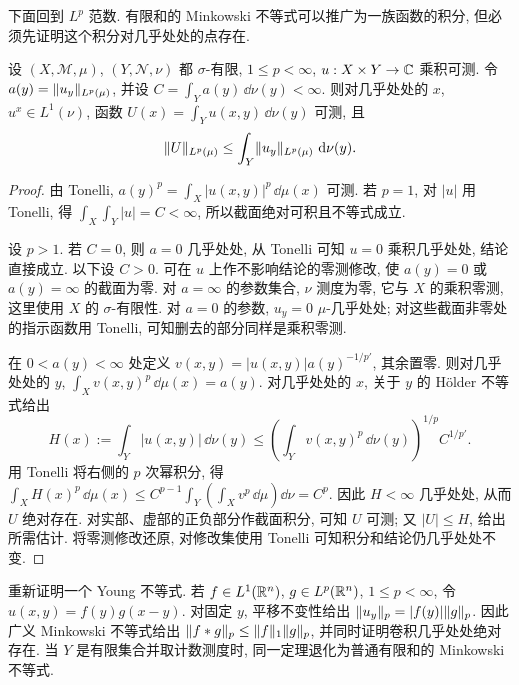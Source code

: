 
下面回到 $L^p$ 范数. 有限和的 Minkowski 不等式可以推广为一族函数的积分, 但必须先证明这个积分对几乎处处的点存在.

\begin{theorem}\label{ra:c8:gmink}
设 $(X,\mathcal M,\mu)$, $(Y,\mathcal N,\nu)$ 都 $\sigma$-有限, $1\le p<\infty$, $u:X\times Y\to\mathbb C$ 乘积可测. 令 $a(y)=\lVert u_y\rVert_{L^p(\mu)}$, 并设 $C=\int_Ya(y)\,\dd\nu(y)<\infty$. 则对几乎处处的 $x$, $u^x\in L^1(\nu)$, 函数 $U(x)=\int_Yu(x,y)\,\dd\nu(y)$ 可测, 且
\[
 \lVert U\rVert_{L^p(\mu)}
 \le\int_Y\lVert u_y\rVert_{L^p(\mu)}\,\,\mathrm d\nu(y).
\]
\end{theorem}
\begin{proof}
由 Tonelli, $a(y)^p=\int_X|u(x,y)|^p\,\dd\mu(x)$ 可测. 若 $p=1$, 对 $|u|$ 用 Tonelli, 得 $\int_X\int_Y|u|=C<\infty$, 所以截面绝对可积且不等式成立.

设 $p>1$. 若 $C=0$, 则 $a=0$ 几乎处处, 从 Tonelli 可知 $u=0$ 乘积几乎处处, 结论直接成立. 以下设 $C>0$. 可在 $u$ 上作不影响结论的零测修改, 使 $a(y)=0$ 或 $a(y)=\infty$ 的截面为零. 对 $a=\infty$ 的参数集合, $\nu$ 测度为零, 它与 $X$ 的乘积零测, 这里使用 $X$ 的 $\sigma$-有限性. 对 $a=0$ 的参数, $u_y=0$ $\mu$-几乎处处; 对这些截面非零处的指示函数用 Tonelli, 可知删去的部分同样是乘积零测.

在 $0<a(y)<\infty$ 处定义 $v(x,y)=|u(x,y)|a(y)^{-1/p'}$, 其余置零. 则对几乎处处的 $y$,
$\int_Xv(x,y)^p\,\dd\mu(x)=a(y)$.
对几乎处处的 $x$, 关于 $y$ 的 Hölder 不等式给出
\[
 H(x):=\int_Y|u(x,y)|\,\dd\nu(y)
 \le\left(\int_Yv(x,y)^p\,\dd\nu(y)\right)^{1/p}C^{1/p'}.
\]
用 Tonelli 将右侧的 $p$ 次幂积分, 得
$\int_XH(x)^p\,\dd\mu(x)\le C^{p-1}\int_Y(\int_Xv^p\,\dd\mu)\dd\nu=C^p$.
因此 $H<\infty$ 几乎处处, 从而 $U$ 绝对存在. 对实部、虚部的正负部分作截面积分, 可知 $U$ 可测; 又 $|U|\le H$, 给出所需估计. 将零测修改还原, 对修改集使用 Tonelli 可知积分和结论仍几乎处处不变.
\end{proof}

\begin{example}
重新证明一个 Young 不等式. 若 $f\in L^1(\mathbb R^n)$, $g\in L^p(\mathbb R^n)$, $1\le p<\infty$, 令 $u(x,y)=f(y)g(x-y)$. 对固定 $y$, 平移不变性给出 $\lVert u_y\rVert_p=|f(y)|\lVert g\rVert_p$. 因此广义 Minkowski 不等式给出 $\lVert f*g\rVert_p\le\lVert f\rVert_1\lVert g\rVert_p$, 并同时证明卷积几乎处处绝对存在. 当 $Y$ 是有限集合并取计数测度时, 同一定理退化为普通有限和的 Minkowski 不等式.
\end{example}


